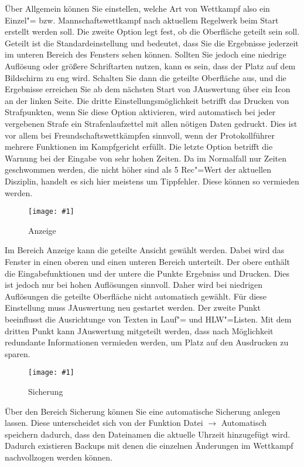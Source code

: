 \documentclass[11pt,a4paper,twoside,ngerman]{article}
\newcommand{\hsmimage}[3]{\begin{figure}[!ht]\centering\texttt{[image: \#1]}\caption{#3}\end{figure}}
\begin{document}
Über \glqq{}Allgemein\grqq{} können Sie einstellen, welche Art von Wettkampf also ein Einzel"= bzw. Mannschaftswettkampf nach aktuellem Regelwerk beim Start erstellt werden soll. Die zweite Option legt fest, ob die Oberfläche \glqq{}geteilt\grqq{} sein soll. Geteilt ist die Standardeinstellung und bedeutet, dass Sie die Ergebnisse jederzeit im unteren Bereich des Fensters sehen können. Sollten Sie jedoch eine niedrige Auflösung oder größere Schriftarten nutzen, kann es sein, dass der Platz auf dem Bildschirm zu eng wird. Schalten Sie dann die geteilte Oberfläche aus, und die Ergebnisse erreichen Sie ab dem nächsten Start von JAuswertung über ein Icon an der linken Seite. Die dritte Einstellungsmöglichkeit betrifft das Drucken von Strafpunkten, wenn Sie diese Option aktivieren, wird automatisch bei jeder vergebenen Strafe ein Strafenlaufzettel mit allen nötigen Daten gedruckt. Dies ist vor allem bei Freundschaftswettkämpfen sinnvoll, wenn der Protokollführer mehrere Funktionen im Kampfgericht erfüllt. Die letzte Option betrifft die Warnung bei der Eingabe von sehr hohen Zeiten. Da im Normalfall nur Zeiten geschwommen werden, die nicht höher sind als 5 \textasteriskcentered{} Rec"=Wert der aktuellen Disziplin, handelt es sich hier meistens um Tippfehler. Diese können so vermieden werden.


\hsmimage{pics/optionen-anzeige}{.66\textwidth}{Anzeige}
Im Bereich \glqq{}Anzeige\grqq{} kann die geteilte Ansicht gewählt werden. Dabei wird das Fenster in einen oberen und einen unteren Bereich unterteilt. Der obere enthält die Eingabefunktionen und der untere die Punkte Ergebniss und Drucken. Dies ist jedoch nur bei hohen Auflösungen sinnvoll. Daher wird bei niedrigen Auflösungen die geteilte Oberfläche nicht automatisch gewählt. Für diese Einstellung muss JAuswertung neu gestartet werden. Der zweite Punkt beeinflusst die Ausrichtunge von Texten in Lauf"= und HLW"=Listen. Mit dem dritten Punkt kann JAuswertung mitgeteilt werden, dass nach Möglichkeit redundante Informationen vermieden werden, um Platz auf den Ausdrucken zu sparen.


\hsmimage{pics/optionen-sicherung}{.66\textwidth}{Sicherung}
Über den Bereich \glqq{}Sicherung\grqq{} können Sie eine automatische Sicherung anlegen lassen. Diese unterscheidet sich von der Funktion \glqq{}Datei\grqq{} \ensuremath{\rightarrow} \glqq{}Automatisch speichern\grqq{} dadurch, dass den Dateinamen die aktuelle Uhrzeit hinzugefügt wird. Dadurch existieren Backups mit denen die einzelnen Änderungen im Wettkampf nachvollzogen werden können.
\end{document}
